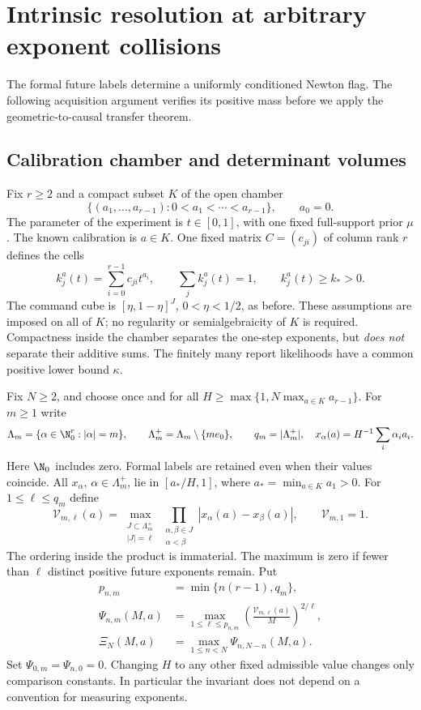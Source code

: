 \section{Intrinsic resolution at arbitrary exponent collisions}\label{sec:collision-geometry}

The formal future labels determine a uniformly conditioned Newton flag.
The following acquisition argument verifies its positive mass before
we apply the geometric-to-causal transfer theorem.

\subsection{Calibration chamber and determinant volumes}
Fix $r\ge2$ and a compact subset $K$ of the open chamber
\[
 \{(a_1,\ldots,a_{r-1}):0<a_1<\cdots<a_{r-1}\},
 \qquad a_0=0.
\]
The parameter of the experiment is $t\in[0,1]$, with one fixed
full-support prior $\mu$. The known calibration is $a\in K$.
One fixed matrix $C=(c_{ji})$ of column rank $r$ defines the cells
\[
 k_j^a(t)=\sum_{i=0}^{r-1}c_{ji}t^{a_i},\qquad
 \sum_jk_j^a(t)=1,\qquad k_j^a(t)\ge k_*>0.
\]
The command cube is $[\eta,1-\eta]^J$, $0<\eta<1/2$, as before.
These assumptions are imposed on all of $K$; no regularity or
semialgebraicity of $K$ is required. Compactness inside the chamber
separates the one-step exponents, but \emph{does not} separate their
additive sums. The finitely many report likelihoods have a common
positive lower bound $\kappa$.

Fix $N\ge2$, and choose once and for all
$H\ge\max\{1,N\max_{a\in K}a_{r-1}\}$. For $m\ge1$ write
\[
 \Lambda_m=\{\alpha\in\N_0^r:|\alpha|=m\},\qquad
 \Lambda_m^+=\Lambda_m\setminus\{me_0\},\qquad
 q_m=|\Lambda_m^+|,
 \quad x_\alpha(a)=H^{-1}\sum_i\alpha_i a_i.
\]
Here $\N_0$ includes zero. Formal labels are retained even when their
values coincide. All $x_\alpha$, $\alpha\in\Lambda_m^+$, lie in
$[a_*/H,1]$, where $a_* =\min_{a\in K}a_1>0$.
For $1\le\ell\le q_m$ define
\begin{equation}\label{eq:determinant-volume}
 \mathcal V_{m,\ell}(a)=
 \max_{\substack{J\subset\Lambda_m^+\\|J|=\ell}}
    \prod_{\substack{\alpha,\beta\in J\\\alpha<\beta}}
          |x_\alpha(a)-x_\beta(a)|,
 \qquad \mathcal V_{m,1}=1.
\end{equation}
The ordering inside the product is immaterial. The maximum is zero if
fewer than $\ell$ distinct positive future exponents remain. Put
\begin{equation}\label{eq:intrinsic-profile}
 \begin{split}
 p_{n,m}&=\min\{n(r-1),q_m\},\\
 \Psi_{n,m}(M,a)&=
   \max_{1\le\ell\le p_{n,m}}
        \left(\frac{\mathcal V_{m,\ell}(a)}{M}\right)^{2/\ell},\\
 \Xi_N(M,a)&=\max_{1\le n<N}\Psi_{n,N-n}(M,a).
 \end{split}
\end{equation}
Set $\Psi_{0,m}=\Psi_{n,0}=0$. Changing $H$ to any other fixed
admissible value changes only comparison constants. In particular the
invariant does not depend on a convention for measuring exponents.

